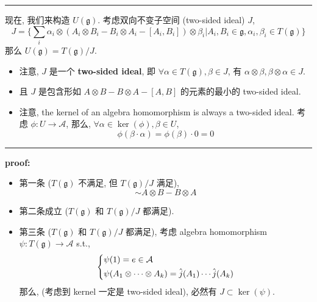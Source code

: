 \begin{itemize}
\begin{tcolorbox}[title=proof:]
		\noindent\rule[0.5ex]{\linewidth}{0.5pt} %
		
		现在, 我们来构造 $U(\mathfrak{g})$. 考虑双向不变子空间 (two-sided ideal) $J$,
		\begin{equation}
			J = \Big\{ \sum_i \alpha_i \otimes (A_i \otimes B_i - B_i \otimes A_i - [A_i, B_i]) \otimes \beta_i \Big| A_i, B_i \in \mathfrak{g}, \alpha_i, \beta_i \in T(\mathfrak{g}) \Big\}
		\end{equation}
		那么 $U(\mathfrak{g}) = T(\mathfrak{g}) / J$.
		\begin{itemize}
			\item 注意, $J$ 是一个 \textbf{two-sided ideal}, 即 $\forall \alpha \in T(\mathfrak{g}), \beta \in J$, 有 $\alpha \otimes \beta, \beta \otimes \alpha \in J$.
			
			\item 且 $J$ 是包含形如 $A \otimes B - B \otimes A - [A, B]$ 的元素的最小的 two-sided ideal.
			
			\item 注意, the kernel of an algebra homomorphism is always a two-sided ideal. 考虑 $\phi : U \rightarrow \mathcal{A}$, 那么, $\forall \alpha \in \ker(\phi), \beta \in U$,
			\begin{equation}
				\phi(\beta \cdot \alpha) = \phi(\beta) \cdot 0 = 0
			\end{equation}
		\end{itemize}
		
		\noindent\rule[0.5ex]{\linewidth}{0.5pt} %
		
		\textbf{proof:}
		
		\begin{itemize}
			\item 第一条 ($T(\mathfrak{g})$ 不满足, 但 $T(\mathfrak{g}) / J$ 满足),
			\begin{equation}
				[A, B] \sim A \otimes B - B \otimes A
			\end{equation}
			
			\item 第二条成立 ($T(\mathfrak{g})$ 和 $T(\mathfrak{g}) / J$ 都满足).
			
			\item 第三条 ($T(\mathfrak{g})$ 和 $T(\mathfrak{g}) / J$ 都满足), 考虑 algebra homomorphism $\psi : T(\mathfrak{g}) \rightarrow \mathcal{A}$ s.t.,
			\begin{equation}
				\begin{dcases}
					\psi(1) = e \in \mathcal{A} \\
					\psi(A_1 \otimes \cdots \otimes A_k) = \hat{j}(A_1) \cdots \hat{j}(A_k)
				\end{dcases}
			\end{equation}
			那么, (考虑到 kernel 一定是 two-sided ideal), 必然有 $J \subset \ker(\psi)$.
			

\end{itemize}
\end{tcolorbox}
\end{itemize}
